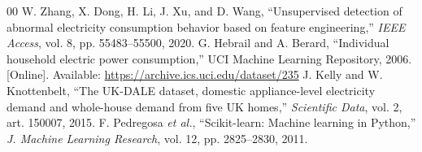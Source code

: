 \documentclass[conference]{IEEEtran}
\begin{document}
\begin{thebibliography}{00}
 W. Zhang, X. Dong, H. Li, J. Xu, and D. Wang, ``Unsupervised detection of abnormal electricity consumption behavior based on feature engineering,'' \emph{IEEE Access}, vol. 8, pp. 55483--55500, 2020.
 G. Hebrail and A. Berard, ``Individual household electric power consumption,'' UCI Machine Learning Repository, 2006. [Online]. Available: \url{https://archive.ics.uci.edu/dataset/235}
 J. Kelly and W. Knottenbelt, ``The UK-DALE dataset, domestic appliance-level electricity demand and whole-house demand from five UK homes,'' \emph{Scientific Data}, vol. 2, art. 150007, 2015.
 F. Pedregosa \emph{et al.}, ``Scikit-learn: Machine learning in Python,'' \emph{J. Machine Learning Research}, vol. 12, pp. 2825--2830, 2011.
\end{thebibliography}
\end{document}
